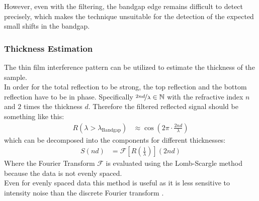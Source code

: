 \documentclass[
	twoside,
	parskip=half,
	a4paper,
]{scrbook}
\begin{document}
However, even with the filtering, the bandgap edge remains difficult to detect precisely, which makes the technique unsuitable for the detection of the expected small shifts in the bandgap.

\subsubsection{Thickness Estimation}
\label{sec:thickness}
The thin film interference pattern can be utilized to estimate the thickness of the sample.\\
In order for the total reflection to be strong, the top reflection and the bottom reflection have to be in phase.
Specifically $\nicefrac{2nd}{\lambda}\in\mathbb{N} $ with the refractive index $n$ and $2$ times the thickness $d$.
Therefore the filtered reflected signal should be something like this:
\begin{align}
	R(\lambda > \lambda_\text{Bandgap}) &\approx \cos \left( 2 \pi \cdot \frac{2 n d}{\lambda} \right)
\end{align}
which can be decomposed into the components for different thicknesses:
\begin{align}
	S(nd) &= \mathcal{F}\left[ R\left(\frac{1}{\lambda}\right)\right]( 2 nd)
\end{align}
Where the Fourier Transform $\mathcal{F}$ is evaluated using the Lomb-Scargle method \cite{scargle} because the data is not evenly spaced.\\
Even for evenly spaced data this method is useful as it is less sensitive to intensity noise than the discrete Fourier transform \cite{scargle}.
\end{document}
